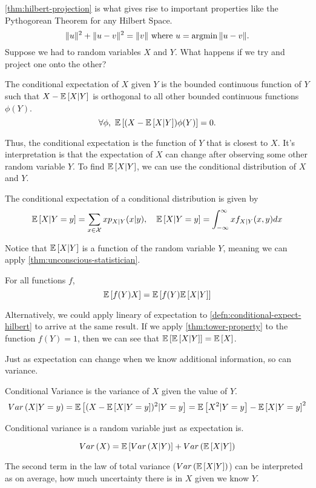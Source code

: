 \cref{thm:hilbert-projection} is what gives rise to important properties like the Pythogorean Theorem for any Hilbert Space.
\[
	\|u\|^2 + \|u-v\|^2 = \|v\| \text{ where } u=\operatorname*{argmin}\|u-v\|.
\]
Suppose we had to random variables $X$ and $Y$. What happens if we try and project one onto the other?
\begin{definition}
	The conditional expectation of $X$ given $Y$ is the bounded continuous function of $Y$ such that $X - \mathbb{E}\left[X|Y\right]$ is orthogonal to all other bounded continuous functions $\phi(Y)$.
	\[
		\forall \phi,\ \expect{(X-\expect{X|Y})\phi(Y)} = 0.
	\]
	\label{defn:conditional-expect-hilbert}
\end{definition}
Thus, the conditional expectation is the function of $Y$ that is closest to $X$. It's interpretation is that the expectation of $X$ can change after observing some other random variable $Y$.
To find $\mathbb{E}\left[X|Y\right]$, we can use the conditional distribution of $X$ and $Y$.
\begin{theorem}
  The conditional expectation of a conditional distribution is given by
  \[
		\mathbb{E}\left[X|Y=y\right] = \sum_{x\in\mathcal{X}}xp_{X|Y}(x|y), \quad \mathbb{E}\left[X|Y=y\right] = \int_{-\infty}^{\infty}xf_{X|Y}(x, y)dx
  \]
  \label{defn:drv-conditional-expect}
\end{theorem}
Notice that $\mathbb{E}\left[X|Y\right]$ is a function of the random variable $Y$, meaning we can apply \cref{thm:unconscious-statistician}.
\begin{theorem}
  For all functions $f$,
  \[
	\mathbb{E}\left[f(Y)X\right] = \mathbb{E}\left[f(Y)\mathbb{E}\left[X|Y\right]\right]
  \]
  \label{thm:tower-property}
\end{theorem}
Alternatively, we could apply lineary of expectation to \cref{defn:conditional-expect-hilbert} to arrive at the same result.
If we apply \cref{thm:tower-property} to the function $f(Y) = 1$, then we can see that $\mathbb{E}\left[\mathbb{E}\left[X|Y\right]\right] = \mathbb{E}\left[X\right]$.

Just as expectation can change when we know additional information, so can variance.
\begin{definition}
  Conditional Variance is the variance of $X$ given the value of $Y$.
  \[
	Var\left(X|Y=y\right) = \mathbb{E}\left[(X - \mathbb{E}\left[X|Y=y\right])^2 | Y=y\right] = \mathbb{E}\left[X^2|Y=y\right] - \mathbb{E}\left[X|Y=y\right]^2
  \]
  \label{defn:conditional-var}
\end{definition}
Conditional variance is a random variable just as expectation is.

\begin{theorem}
  \[
	Var\left(X\right) = \mathbb{E}\left[Var\left(X|Y\right)\right] + Var\left(\mathbb{E}\left[X|Y\right]\right)
  \]
  \label{thm:total-variance}
\end{theorem}
The second term in the law of total variance ($Var\left(\mathbb{E}\left[X|Y\right]\right)$) can be interpreted as on average, how much uncertainty there is in $X$ given we know $Y$.

